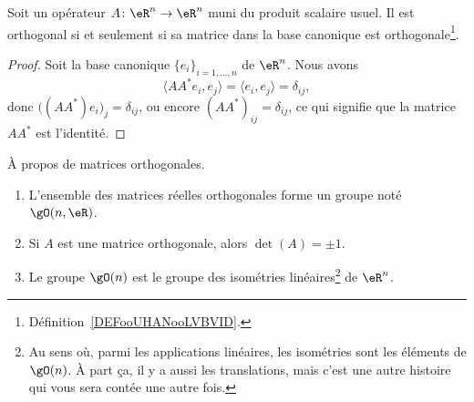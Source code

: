\begin{lemma}       \label{LEMooSSALooSBFzJb}
    Soit un opérateur \( A\colon \eR^n\to \eR^n\) muni du produit scalaire usuel. Il est orthogonal si et seulement si sa matrice dans la base canonique est orthogonale\footnote{Définition~\ref{DEFooUHANooLVBVID}.}.
\end{lemma}

\begin{proof}
    Soit la base canonique \( \{ e_i \}_{i=1,\ldots, n}\) de \( \eR^n\). Nous avons
    \begin{equation}
        \langle AA^*e_i, e_j\rangle =\langle e_i, e_j\rangle =\delta_{ij},
    \end{equation}
    donc \( \big( (AA^*)e_i \big)_j=\delta_{ij}\), ou encore \( (AA^*)_{ij}=\delta_{ij}\), ce qui signifie que la matrice $AA^*$ est l'identité.
\end{proof}

\begin{proposition}     \label{PropKBCXooOuEZcS}
    À propos de matrices orthogonales.
    \begin{enumerate}
        \item
            L'ensemble des matrices réelles orthogonales forme un groupe noté \( \gO(n,\eR)\).
        \item
            Si \( A\) est une matrice orthogonale, alors \( \det(A)=\pm 1\).
        \item       \label{ITEMooOWMBooHUatNb}
            Le groupe \( \gO(n)\) est le groupe des isométries linéaires\footnote{Au sens où, parmi les applications linéaires, les isométries sont les éléments de \( \gO(n)\). À part ça, il y a aussi les translations, mais c'est une autre histoire qui vous sera contée une autre fois.} de \( \eR^n\).
    \end{enumerate}
\end{proposition}


